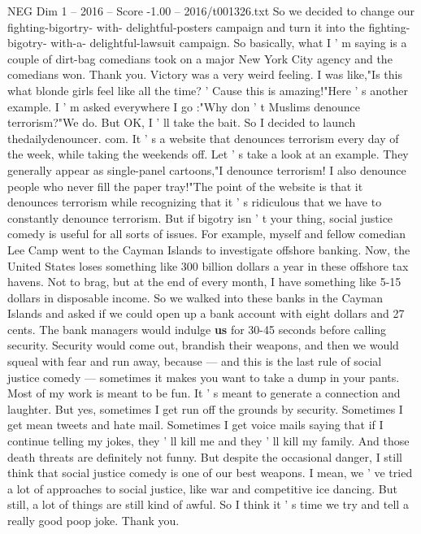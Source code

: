 \begin{textsample}{NEG Dim 1 – 2016 – Score -1.00 – 2016/t001326.txt}
So we decided to change our fighting-bigortry- with- delightful-posters campaign and turn it into the fighting-bigotry- with-a- delightful-lawsuit campaign.
So basically, what I ' m saying is a couple of dirt-bag comedians took on a major New York City agency and the comedians won.
Thank you.
Victory was a very weird feeling.
I was like,"Is this what blonde girls feel like all the time? ' Cause this is amazing!"Here ' s another example.
I ' m asked everywhere I go :"Why don ' t Muslims denounce terrorism?"We do.
But OK, I ' ll take the bait.
So I decided to launch thedailydenouncer. com.
It ' s a website that denounces terrorism every day of the week, while taking the weekends off.
Let ' s take a look at an example.
They generally appear as single-panel cartoons,"I denounce terrorism!
I also denounce people who never fill the paper tray!"The point of the website is that it denounces terrorism while recognizing that it ' s ridiculous that we have to constantly denounce terrorism.
But if bigotry isn ' t your thing, social justice comedy is useful for all sorts of issues.
For example, myself and fellow comedian Lee Camp went to the Cayman Islands to investigate offshore banking.
Now, the United States loses something like 300 billion dollars a year in these offshore tax havens.
Not to brag, but at the end of every month, I have something like 5-15 dollars in disposable income.
So we walked into these banks in the Cayman Islands and asked if we could open up a bank account with eight dollars and 27 cents.
The bank managers would indulge \textbf{us} for 30-45 seconds before calling security.
Security would come out, brandish their weapons, and then we would squeal with fear and run away, because — and this is the last rule of social justice comedy — sometimes it makes you want to take a dump in your pants.
Most of my work is meant to be fun.
It ' s meant to generate a connection and laughter.
But yes, sometimes I get run off the grounds by security.
Sometimes I get mean tweets and hate mail.
Sometimes I get voice mails saying that if I continue telling my jokes, they ' ll kill me and they ' ll kill my family.
And those death threats are definitely not funny.
But despite the occasional danger, I still think that social justice comedy is one of our best weapons.
I mean, we ' ve tried a lot of approaches to social justice, like war and competitive ice dancing.
But still, a lot of things are still kind of awful.
So I think it ' s time we try and tell a really good poop joke.
Thank you.

\end{textsample}
